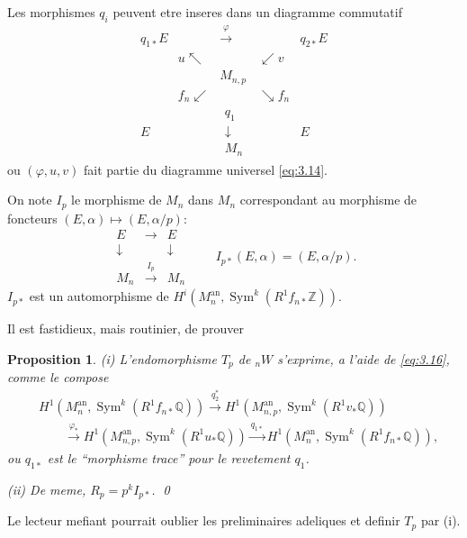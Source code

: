 \documentclass[11pt,reqno]{amsart}
\theoremstyle{plain}
\newtheorem{proposition}[theorem]{Proposition}
\theoremstyle{remark}
\DeclareMathOperator{\Sym}{Sym}
\newcommand{\Z}{\mathbb{Z}}
\newcommand{\Q}{\mathbb{Q}}
\newcommand{\xto}[1]{\xrightarrow{#1}}
\numberwithin{equation}{section}
\begin{document}
Les morphismes $q_i$ peuvent etre inseres dans un diagramme commutatif
\begin{equation}\label{eq:3.16}
\begin{array}{ccccc}
q_{1*}E & & \xrightarrow{\;\varphi\;} & & q_{2*}E \\
& u \nwarrow & & \swarrow v & \\
& & M_{n,p} & & \\
& f_n \swarrow & & \searrow f_n & \\
E & & \begin{array}{c} q_1 \\ \downarrow \\ M_n \end{array} & & E
\end{array}
\end{equation}
ou $(\varphi, u, v)$ fait partie du diagramme universel \eqref{eq:3.14}.

On note $I_p$ le morphisme de $M_n$ dans $M_n$ correspondant au morphisme de foncteurs $(E, \alpha) \mapsto (E, \alpha/p)$:
\begin{equation}\label{eq:3.17}
\begin{array}{ccc}
E & \longrightarrow & E \\
\downarrow & & \downarrow \\
M_n & \xrightarrow{\;I_p\;} & M_n
\end{array}
\qquad I_{p*}(E, \alpha) = (E, \alpha/p).
\end{equation}
$I_{p*}$ est un automorphisme de $H^i(M_n^{\text{an}}, \Sym^k(R^1f_{n*}\Z))$.

Il est fastidieux, mais routinier, de prouver

\begin{proposition}\label{prop:3.18}
\textup{(i)} L'endomorphisme $T_p$ de ${}_nW$ s'exprime, a l'aide de \eqref{eq:3.16}, comme le compose
\[
\begin{aligned}
&H^1(M_n^{\text{an}}, \Sym^k(R^1f_{n*}\Q)) \xto{q_2^*} H^1(M_{n,p}^{\text{an}}, \Sym^k(R^1v_*\Q)) \\
&\qquad \xto{\varphi_*} H^1(M_{n,p}^{\text{an}}, \Sym^k(R^1u_*\Q)) \xto{q_{1*}} H^1(M_n^{\text{an}}, \Sym^k(R^1f_{n*}\Q)),
\end{aligned}
\]
ou $q_{1*}$ est le ``morphisme trace'' pour le revetement $q_1$.

\textup{(ii)} De meme, $R_p = p^k I_{p*}$. \qed
\end{proposition}

Le lecteur mefiant pourrait oublier les preliminaires adeliques et definir $T_p$ par (i).
\end{document}
